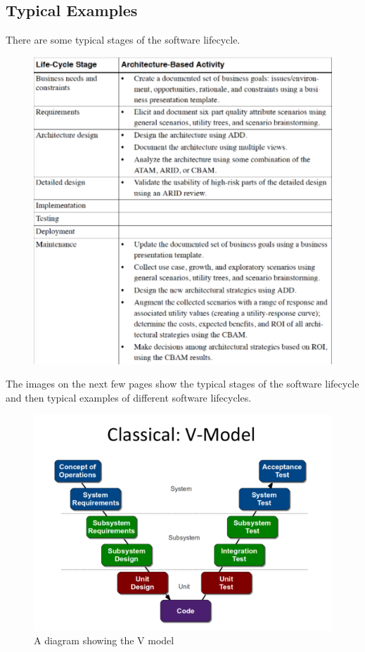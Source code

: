 \documentclass[a4paper]{article}
\begin{document}
\subsection{Typical Examples}
There are some typical stages of the software lifecycle.
\begin{figure}[H]
\begin{center} 
    \includegraphics[scale=0.5]{images/LifecycleStages.pdf}
\end{center}
\end{figure}

The images on the next few pages show the typical stages of the software lifecycle and then typical examples of different software lifecycles.

\begin{figure}[H]
\begin{center} 
    \includegraphics[scale=0.3]{images/VModel.pdf}
    \caption{A diagram showing the V model}
\end{center}
\end{figure}
\end{document}
